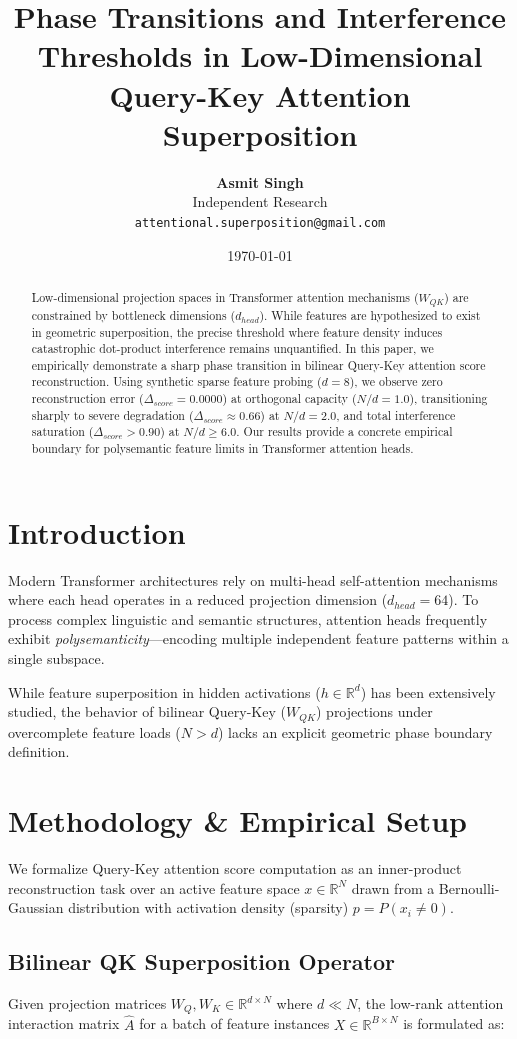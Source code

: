 \documentclass[10pt,twocolumn,letterpaper]{article}
\title{\textbf{Phase Transitions and Interference Thresholds in Low-Dimensional Query-Key Attention Superposition}}
\author{
  \textbf{Asmit Singh}\\
  Independent Research\\
  \texttt{attentional.superposition@gmail.com}
}
\date{\today}
\begin{document}
\maketitle

\begin{abstract}
Low-dimensional projection spaces in Transformer attention mechanisms ($W_{QK}$) are constrained by bottleneck dimensions ($d_{head}$). While features are hypothesized to exist in geometric superposition, the precise threshold where feature density induces catastrophic dot-product interference remains unquantified. In this paper, we empirically demonstrate a sharp phase transition in bilinear Query-Key attention score reconstruction. Using synthetic sparse feature probing ($d=8$), we observe zero reconstruction error ($\Delta_{score} = 0.0000$) at orthogonal capacity ($N/d = 1.0$), transitioning sharply to severe degradation ($\Delta_{score} \approx 0.66$) at $N/d = 2.0$, and total interference saturation ($\Delta_{score} > 0.90$) at $N/d \ge 6.0$. Our results provide a concrete empirical boundary for polysemantic feature limits in Transformer attention heads.
\end{abstract}

\section{Introduction}
Modern Transformer architectures rely on multi-head self-attention mechanisms where each head operates in a reduced projection dimension ($d_{head} = 64$). To process complex linguistic and semantic structures, attention heads frequently exhibit \textit{polysemanticity}---encoding multiple independent feature patterns within a single subspace.

While feature superposition in hidden activations ($h \in \mathbb{R}^d$) has been extensively studied, the behavior of bilinear Query-Key ($W_{QK}$) projections under overcomplete feature loads ($N > d$) lacks an explicit geometric phase boundary definition.

\section{Methodology \& Empirical Setup}
We formalize Query-Key attention score computation as an inner-product reconstruction task over an active feature space $x \in \mathbb{R}^N$ drawn from a Bernoulli-Gaussian distribution with activation density (sparsity) $p = P(x_i \neq 0)$.

\subsection{Bilinear QK Superposition Operator}
Given projection matrices $W_Q, W_K \in \mathbb{R}^{d \times N}$ where $d \ll N$, the low-rank attention interaction matrix $\hat{A}$ for a batch of feature instances $X \in \mathbb{R}^{B \times N}$ is formulated as:
\end{document}
